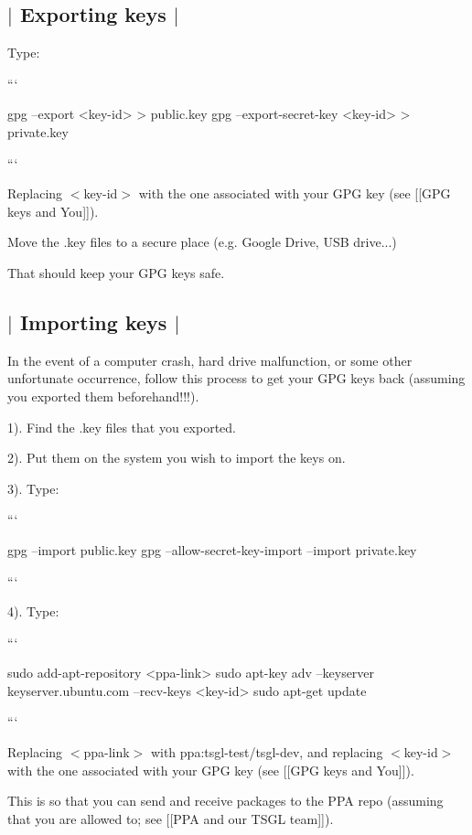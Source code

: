  \subsection*{$\vert$ Exporting keys $\vert$ }

Type\-:

``` \begin{DoxyVerb}gpg --export <key-id> > public.key
gpg --export-secret-key <key-id> > private.key
\end{DoxyVerb}


```

Replacing {\ttfamily $<$key-\/id$>$} with the one associated with your G\-P\-G key (see \mbox{[}\mbox{[}G\-P\-G keys and You\mbox{]}\mbox{]}).

Move the {\ttfamily .key} files to a secure place (e.\-g. Google Drive, U\-S\-B drive...)

That should keep your G\-P\-G keys safe. 

 \subsection*{$\vert$ Importing keys $\vert$ }

In the event of a computer crash, hard drive malfunction, or some other unfortunate occurrence, follow this process to get your G\-P\-G keys back (assuming you exported them beforehand!!!).

1). Find the {\ttfamily .key} files that you exported.

2). Put them on the system you wish to import the keys on.

3). Type\-:

``` \begin{DoxyVerb}gpg --import public.key
gpg --allow-secret-key-import --import private.key
\end{DoxyVerb}


```

4). Type\-:

``` \begin{DoxyVerb}sudo add-apt-repository <ppa-link> 
sudo apt-key adv --keyserver keyserver.ubuntu.com --recv-keys <key-id> 
sudo apt-get update 
\end{DoxyVerb}


```

Replacing {\ttfamily $<$ppa-\/link$>$} with {\ttfamily ppa\-:tsgl-\/test/tsgl-\/dev}, and replacing {\ttfamily $<$key-\/id$>$} with the one associated with your G\-P\-G key (see \mbox{[}\mbox{[}G\-P\-G keys and You\mbox{]}\mbox{]}).

This is so that you can send and receive packages to the P\-P\-A repo (assuming that you are allowed to; see \mbox{[}\mbox{[}P\-P\-A and our T\-S\-G\-L team\mbox{]}\mbox{]}). 